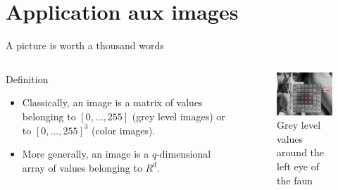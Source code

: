 \documentclass[xcolor=pdftex,dvipsnames,table,mathserif]{beamer}
\begin{document}
\section{Application aux images}

\begin{frame}{A picture is worth a thousand words}

  \begin{columns}
    \begin{column}{.5\textwidth}
      \begin{block}{Definition}
        \begin{itemize}
        \item Classically, an image is a matrix of values belonging to $[0, \ldots, 255]$ (grey level images) or to $[0, \ldots, 255]^3$ (color images).
        \item More generally, an image is a $q$-dimensional array of values belonging to $R^d$.
        \end{itemize}
      \end{block}

    \end{column}

    \begin{column}{.5\textwidth}
      \begin{figure}
        \centering
        \includegraphics[width=5cm]{faune.png}\\
        \tiny{Grey level values around the left eye of the faun}
      \end{figure}

    \end{column}
  \end{columns}

\end{frame}
\end{document}
